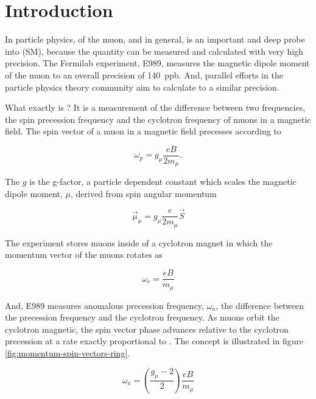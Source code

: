 \chapter {Introduction} \label{ch:intro}

In particle physics, \gmtwo of the muon, and \gmtwo in general, is an important and deep probe into \tsm (SM), because the quantity can be measured and calculated with very high precision.  The Fermilab \gmtwo experiment, E989, measures the magnetic dipole moment of the muon to an overall precision of \SI{140}{ppb}.  And, parallel efforts in the particle physics theory community aim to calculate \mugmtwo to a similar precision.

What exactly is \gmtwo? It is a measurement of the difference between two frequencies, the spin precession frequency and the cyclotron frequency of muons in a magnetic field.  The spin vector of a muon in a magnetic field precesses according to 

\begin{equation}
\label{eqn:omega-p}
\omega_p = g_\mu \frac{e B}{2 m_\mu}.
\end{equation}

\noindent
The $g$ is the g-factor, a particle dependent constant which scales the magnetic dipole moment, $\mu$, derived from spin angular momentum

\begin{equation}
\label{eqn:muon-mu}
\vec{\mu}_\mu = g_\mu \frac{e}{2 m_\mu} \vec{S}
\end{equation}

\noindent
The \mugmtwo experiment stores muons inside of a cyclotron magnet in which the momentum vector of the muons rotates as

\begin{equation}
\label{eqn:omega-c}
\omega_c = \frac{e B}{m_\mu}
\end{equation}

\noindent
And, E989 measures anomalous precession frequency, $\omega_a$, the difference between the precession frequency and the cyclotron frequency.  As muons orbit the cyclotron magnetic, the spin vector phase advances relative to the cyclotron precession at a rate exactly proportional to \gmtwo.  The concept is illustrated in figure \ref{fig:momentum-spin-vectors-ring}.

\begin{equation}
\label{eqn:muon-g-2}
\omega_a = \left( \frac{g_\mu - 2}{2} \right) \frac{e B}{m_\mu}
\end{equation}

